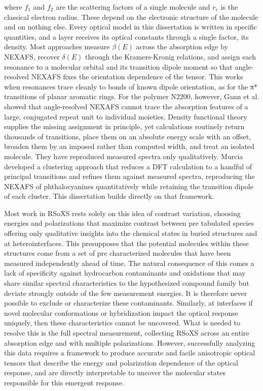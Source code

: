 where \(f_{1}\) and \(f_{2}\) are the scattering factors of a single molecule and \(r_{e}\) is the classical electron radius.\autocite{attwoodSoftXRaysExtreme1999} These depend on the electronic structure of the molecule and on nothing else. Every optical model in this dissertation is written in specific quantities, and a layer receives its optical constants through a single factor, its density. Most approaches measure \(\beta(E)\) across the absorption edge by NEXAFS, recover \(\delta(E)\) through the Kramers-Kronig relations\autocite{yanAccurateFacileDetermination2013,wattsCalculationKramersKronigTransform2014}, and assign each resonance to a molecular orbital and its transition dipole moment so that angle-resolved NEXAFS fixes the orientation dependence of the tensor.\autocite{stohrNEXAFSSpectroscopy1992} This works when resonances trace cleanly to bonds of known dipole orientation, as for the π* transitions of planar aromatic rings. For the polymer N2200, however, Gann et al. showed that angle-resolved NEXAFS cannot trace the absorption features of a large, conjugated repeat unit to individual moieties.\autocite{gannNearedgeXrayAbsorption2014} Density functional theory supplies the missing assignment in principle, yet calculations routinely return thousands of transitions, place them on an absolute energy scale with an offset, broaden them by an imposed rather than computed width, and treat an isolated molecule. They have reproduced measured spectra only qualitatively.\autocite{suFirstPrinciplesPredictionsNearEdge2017} Murcia developed a clustering approach that reduces a DFT calculation to a handful of principal transitions and refines them against measured spectra, reproducing the NEXAFS of phthalocyanines quantitatively while retaining the transition dipole of each cluster.\autocite{murciaQuantitativeBondTraceableResonant2026} This dissertation builds directly on that framework.

Most work in RSoXS rests solely on this idea of contrast variation, choosing energies and polarizations that maximize contrast between pre tabulated species offering only qualitative insights into the chemical states in buried structures and at heterointerfaces. This presupposes that the potential molecules within these structures come from a set of pre characterized molecules that have been measured independently ahead of time. The natural consequence of this comes a lack of specificity against hydrocarbon contaminants and oxidations that may share similar spectral characteristics to the hypothesized compound family but deviate strongly outside of the few measurement energies. It is therefore never possible to exclude or characterize these contaminants. Similarly, at interfaces if novel molecular conformations or hybridization impact the optical response uniquely, then these characteristics cannot be uncovered. What is needed to resolve this is the full spectral measurement, collecting RSoXS across an entire absorption edge and with multiple polarizations. However, successfully analyzing this data requires a framework to produce accurate and facile anisotropic optical tensors that describe the energy and polarization dependence of the optical response, and are directly interpretable to uncover the molecular states responsible for this emergent response.

